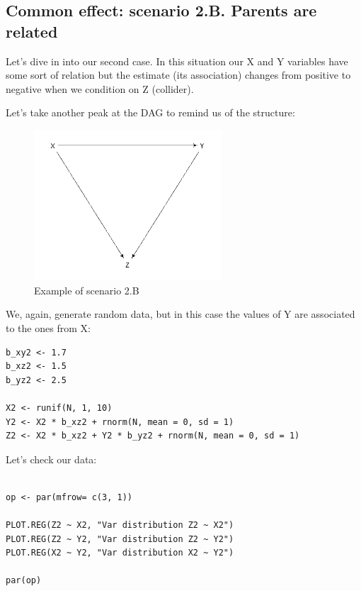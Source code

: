 \documentclass{article}
\begin{document}
\subsection{Common effect: scenario 2.B. Parents are related}

Let's dive in into our second case. In this situation our X and Y variables have some sort of relation but the estimate (its association) changes from positive to negative when we condition on Z (collider).\par

Let's take another peak at the DAG to remind us of the structure:\par

\begin{figure}[h]
\caption{Example of scenario 2.B}
\includegraphics[width=7cm]{DAG_Situation2.png}
\centering
\end{figure}
We, again, generate random data, but in this case the values of Y are associated to the ones from X:\par

\begin{lstlisting}
b_xy2 <- 1.7 
b_xz2 <- 1.5
b_yz2 <- 2.5

X2 <- runif(N, 1, 10)
Y2 <- X2 * b_xz2 + rnorm(N, mean = 0, sd = 1)
Z2 <- X2 * b_xz2 + Y2 * b_yz2 + rnorm(N, mean = 0, sd = 1)
\end{lstlisting}

Let's check our data:\par

\begin{lstlisting}

op <- par(mfrow= c(3, 1))

PLOT.REG(Z2 ~ X2, "Var distribution Z2 ~ X2")
PLOT.REG(Z2 ~ Y2, "Var distribution Z2 ~ Y2")
PLOT.REG(X2 ~ Y2, "Var distribution X2 ~ Y2")

par(op)
\end{lstlisting}
\end{document}

